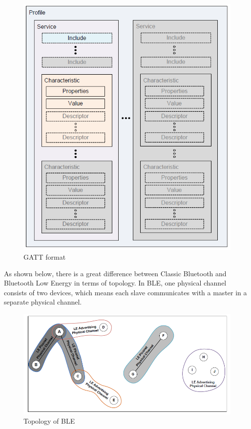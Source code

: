 \documentclass{Nan_Thesis}
\begin{document}
\begin{figure}[h]
  \centering 
      \includegraphics[scale=0.6]{pic/gattformat.png} 
  \caption{GATT format \cite{bluetooth2010bluetooth}}
\end{figure} 

As shown below, there is a great difference between Classic Bluetooth and Bluetooth Low Energy in terms of topology. In BLE, one physical channel consists of two devices, which means each slave communicates with a master in a separate physical channel. 

\begin{figure}[h]
  \centering 
      \includegraphics[scale=0.6]{pic/bletopopogy.png} 
  \caption{Topology of BLE \cite{bluetooth2010bluetooth}}
\end{figure} 
\end{document}
